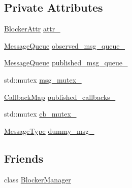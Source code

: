 \subsection*{Private Attributes}
\begin{DoxyCompactItemize}
\item 
\hyperlink{structapollo_1_1cyber_1_1blocker_1_1BlockerAttr}{Blocker\-Attr} \hyperlink{classapollo_1_1cyber_1_1blocker_1_1Blocker_a31770fde4b92797a07af4f3eadb824ff}{attr\-\_\-}
\item 
\hyperlink{classapollo_1_1cyber_1_1blocker_1_1Blocker_a4c973a5afc09ca2b666f9436f2e74189}{Message\-Queue} \hyperlink{classapollo_1_1cyber_1_1blocker_1_1Blocker_ae27c916e638e027b4d06e6ff5a385b07}{observed\-\_\-msg\-\_\-queue\-\_\-}
\item 
\hyperlink{classapollo_1_1cyber_1_1blocker_1_1Blocker_a4c973a5afc09ca2b666f9436f2e74189}{Message\-Queue} \hyperlink{classapollo_1_1cyber_1_1blocker_1_1Blocker_afeb0c15d39a0c555540858cfc86a2ce3}{published\-\_\-msg\-\_\-queue\-\_\-}
\item 
std\-::mutex \hyperlink{classapollo_1_1cyber_1_1blocker_1_1Blocker_ab6e6114fe76a04ec1b92c13482cffa00}{msg\-\_\-mutex\-\_\-}
\item 
\hyperlink{classapollo_1_1cyber_1_1blocker_1_1Blocker_ace3015075930b98718441655315002d5}{Callback\-Map} \hyperlink{classapollo_1_1cyber_1_1blocker_1_1Blocker_a930f027bbb0fa388b72301b376fa75b2}{published\-\_\-callbacks\-\_\-}
\item 
std\-::mutex \hyperlink{classapollo_1_1cyber_1_1blocker_1_1Blocker_aef42b424d6fe0416c40d3ea5110cbc7f}{cb\-\_\-mutex\-\_\-}
\item 
\hyperlink{classapollo_1_1cyber_1_1blocker_1_1Blocker_ab6f5eb86a03109c66581e377a896650a}{Message\-Type} \hyperlink{classapollo_1_1cyber_1_1blocker_1_1Blocker_a0b66558da5f459f983f120203583e613}{dummy\-\_\-msg\-\_\-}
\end{DoxyCompactItemize}
\subsection*{Friends}
\begin{DoxyCompactItemize}
\item 
class \hyperlink{classapollo_1_1cyber_1_1blocker_1_1Blocker_a125f26fb85cd399c64b22b95df83f810}{Blocker\-Manager}
\end{DoxyCompactItemize}


